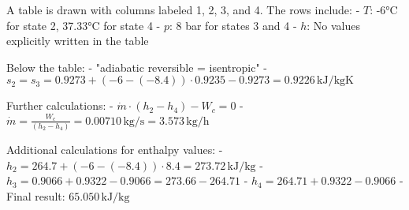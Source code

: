 A table is drawn with columns labeled 1, 2, 3, and 4. The rows include:  
- \( T \): -6°C for state 2, 37.33°C for state 4  
- \( p \): 8 bar for states 3 and 4  
- \( h \): No values explicitly written in the table  

Below the table:  
- "adiabatic reversible = isentropic"  
- \( s_2 = s_3 = 0.9273 + (-6 - (-8.4)) \cdot 0.9235 - 0.9273 = 0.9226 \, \text{kJ/kgK} \)  

Further calculations:  
- \( \dot{m} \cdot (h_2 - h_4) - W_c = 0 \)  
- \( \dot{m} = \frac{W_c}{(h_2 - h_4)} = 0.00710 \, \text{kg/s} = 3.573 \, \text{kg/h} \)  

Additional calculations for enthalpy values:  
- \( h_2 = 264.7 + (-6 - (-8.4)) \cdot 8.4 = 273.72 \, \text{kJ/kg} \)  
- \( h_3 = 0.9066 + 0.9322 - 0.9066 = 273.66 - 264.71 \)  
- \( h_4 = 264.71 + 0.9322 - 0.9066 \)  
- Final result: \( 65.050 \, \text{kJ/kg} \)